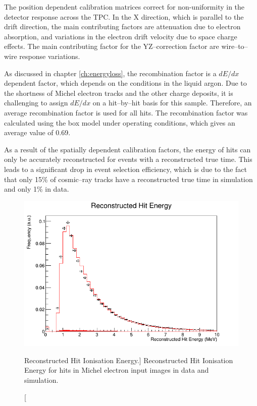 The position dependent calibration matrices correct for non-uniformity in the
detector response across the TPC. In the X direction, which is parallel to the
drift direction, the main contributing factors are attenuation due to electron 
absorption, and variations in the electron drift velocity due to space charge 
effects. The main contributing factor for the YZ--correction factor are 
wire--to--wire response variations. 

As discussed in chapter \ref{ch:energyloss}, the recombination factor is a
$dE/dx$ dependent factor, which depends on the conditions in the liquid
argon. Due to the shortness of Michel electron tracks and the other charge 
deposits, it is challenging to assign $dE/dx$ on a hit--by--hit basis for this 
sample. Therefore, an average recombination factor is used for all hits. The 
recombination factor was calculated using the box model \cite{Acciarri2013a} 
under \protodune{} operating conditions, which gives an average value of 0.69.

As a result of the spatially dependent calibration factors, the energy of hits 
can only be accurately reconstructed for events with a reconstructed true 
time. This leads to a significant drop in event selection efficiency, which is 
due to the fact that only 15\% of cosmic--ray tracks have a reconstructed true 
time in simulation and only 1\% in data.

\begin{figure}
	\centering
	\includegraphics[width=\textwidth]{figures/hit_ion_reco.png}
	\caption
	[Reconstructed Hit Ionisation Energy.]
	{Reconstructed Hit Ionisation Energy for hits in Michel electron input images 
	in data and simulation.}
	\label{fig:hit_ion_reco}
\end{figure}

